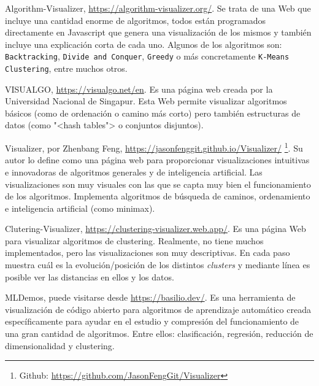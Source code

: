 Algorithm-Visualizer, \url{https://algorithm-visualizer.org/}. Se trata de una
Web que incluye una cantidad enorme de algoritmos, todos están programados
directamente en Javascript que genera una visualización de los mismos y también
incluye una explicación corta de cada uno. Algunos de los algoritmos son:
\texttt{Backtracking}, \texttt{Divide and Conquer}, \texttt{Greedy} o más
concretamente \texttt{K-Means Clustering}, entre muchos otros.


VISUALGO, \url{https://visualgo.net/en}. Es una página web creada por la
Universidad Nacional de Singapur. Esta Web permite visualizar algoritmos básicos
(como de ordenación o camino más corto) pero también estructuras de datos (como
"<hash tables"> o conjuntos disjuntos).


Visualizer, por Zhenbang Feng, \url{https://jasonfenggit.github.io/Visualizer/}
\footnote{ Github: \url{https://github.com/JasonFengGit/Visualizer}}. Su autor
lo define como una página web para proporcionar visualizaciones intuitivas e
innovadoras de algoritmos generales y de inteligencia artificial. Las
visualizaciones son muy visuales con las que se capta muy bien el funcionamiento
de los algoritmos. Implementa algoritmos de búsqueda de caminos, ordenamiento e
inteligencia artificial (como minimax).



Clutering-Visualizer, \url{https://clustering-visualizer.web.app/}. Es una
página Web para visualizar algoritmos de clustering. Realmente, no tiene muchos
implementados, pero las visualizaciones son muy descriptivas. En cada paso
muestra cuál es la evolución/posición de los distintos \textit{clusters} y mediante línea
es posible ver las distancias en ellos y los datos.



MLDemos, puede visitarse desde \url{https://basilio.dev/}. Es una herramienta de
visualización de código abierto para algoritmos de aprendizaje automático creada
específicamente para ayudar en el estudio y compresión del funcionamiento de una
gran cantidad de algoritmos. Entre ellos: clasificación, regresión, reducción de
dimensionalidad y clustering.

